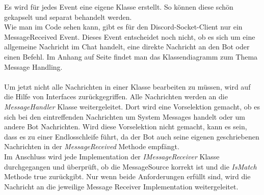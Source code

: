 \documentclass[a4paper, table]{article}
\begin{document}
Es wird für jedes Event eine eigene Klasse erstellt. 
So können diese schön gekapselt und separat behandelt werden.\\
Wie man im Code sehen kann, gibt es für den Discord-Socket-Client nur ein MessageReceived Event. 
Dieses Event entscheidet noch nicht, ob es sich um eine allgemeine Nachricht im Chat handelt, eine direkte Nachricht an den Bot oder einen Befehl.
Im Anhang auf Seite \pageref*{fig:message-handling} findet man das Klassendiagramm zum Thema Message Handling.\\\\
Um jetzt nicht alle Nachrichten in einer Klasse bearbeiten zu müssen, wird auf die Hilfe von Interfaces zurückgegriffen.
Alle Nachrichten werden an die \textit{MessageHandler} Klasse weitergeleitet. 
Dort wird eine Vorselektion gemacht, ob es sich bei den eintreffenden Nachrichten um System Messages handelt oder um andere Bot Nachrichten. 
Wird diese Vorselektion nicht gemacht, kann es sein, dass es zu einer Endlosschleife führt, da der Bot auch seine eigenen geschriebenen Nachrichten in der \textit{MessageReceived} Methode empfängt.\\
Im Anschluss wird jede Implementation der \textit{IMessageReceiver} Klasse durchgegangen und überprüft, ob die MessageSource korrekt ist und die \textit{IsMatch} Methode true zurückgibt. 
Nur wenn beide Anforderungen erfüllt sind, wird die Nachricht an die jeweilige Message Receiver Implementation weitergeleitet.
\end{document}
